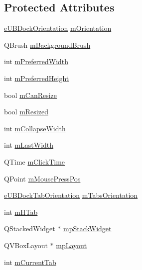 \subsection*{Protected Attributes}
\begin{DoxyCompactItemize}
\item 
\hyperlink{_u_b_dock_palette_8h_a697273b91063b41b5f17e942bcc445c4}{e\-U\-B\-Dock\-Orientation} \hyperlink{class_u_b_dock_palette_ae4ee6d66d55079cb8fc31fb5c890faf4}{m\-Orientation}
\item 
Q\-Brush \hyperlink{class_u_b_dock_palette_a75d5806767dde185d5c4231f3c313088}{m\-Background\-Brush}
\item 
int \hyperlink{class_u_b_dock_palette_a0f5fb645e2a3c25f671801ab2200fb1f}{m\-Preferred\-Width}
\item 
int \hyperlink{class_u_b_dock_palette_a25e6b09786386b27e982a224431dfb8d}{m\-Preferred\-Height}
\item 
bool \hyperlink{class_u_b_dock_palette_a260643aac69a6ecff7b344bafd9cfffe}{m\-Can\-Resize}
\item 
bool \hyperlink{class_u_b_dock_palette_aa4ccb0ada33ff1b10f9354f87df8f2f1}{m\-Resized}
\item 
int \hyperlink{class_u_b_dock_palette_a0b425ad7936ee42a5dcf117b4327bde4}{m\-Collapse\-Width}
\item 
int \hyperlink{class_u_b_dock_palette_a4632ac43fa9b7f64df64ff263a5886ce}{m\-Last\-Width}
\item 
Q\-Time \hyperlink{class_u_b_dock_palette_a70b3694376d28f25de47e1d1c5c0c958}{m\-Click\-Time}
\item 
Q\-Point \hyperlink{class_u_b_dock_palette_af1789f0531dcdeacfcb4128e48efbd74}{m\-Mouse\-Press\-Pos}
\item 
\hyperlink{_u_b_dock_palette_8h_a8417e31f28356d29373f251be2649a87}{e\-U\-B\-Dock\-Tab\-Orientation} \hyperlink{class_u_b_dock_palette_aa285a86c3980a4a67e3c54e1d6a2e0df}{m\-Tabs\-Orientation}
\item 
int \hyperlink{class_u_b_dock_palette_a4dd61dbf2e05e83fc8b04474741824fb}{m\-H\-Tab}
\item 
Q\-Stacked\-Widget $\ast$ \hyperlink{class_u_b_dock_palette_a6af957d91461245a458cc5207e4398b1}{mp\-Stack\-Widget}
\item 
Q\-V\-Box\-Layout $\ast$ \hyperlink{class_u_b_dock_palette_a6678ff62b4546a46acb55763dd46b849}{mp\-Layout}
\item 
int \hyperlink{class_u_b_dock_palette_a5a410c0bb7ca9aee7698b2f055adf600}{m\-Current\-Tab}
\item 

\end{DoxyCompactItemize}
